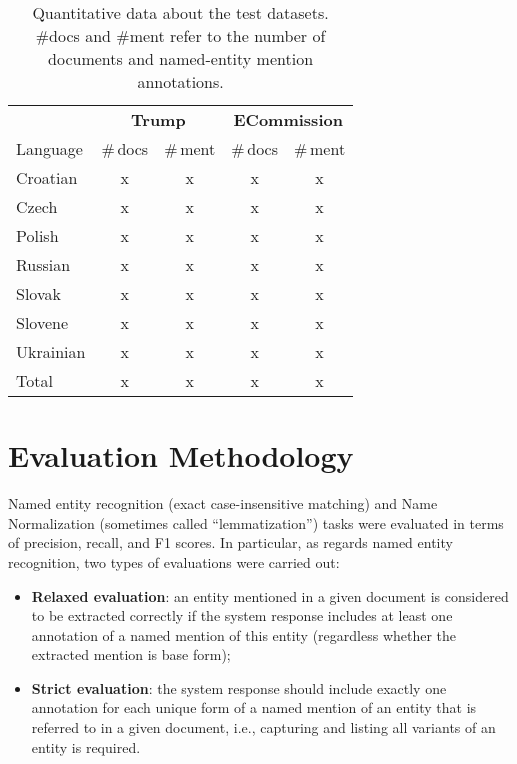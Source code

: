 \documentclass[11pt]{article}
\begin{document}
\begin{table}
\begin{center}
\begin{footnotesize}
\begin{tabular}{lcccc}
\toprule 
 & \multicolumn{2}{c}{\textbf{{\sc Trump}}} & \multicolumn{2}{c}{\textbf{{\sc ECommission}}} \\
\cmidrule(lr){2-3}
\cmidrule(lr){4-5}
Language &  \#\,docs & \#\,ment & \#\,docs & \#\,ment \\
\midrule
Croatian & x & x & x & x \\
Czech & x & x & x & x \\
Polish & x & x & x & x \\
Russian & x & x & x & x \\
Slovak  & x & x & x & x \\
Slovene & x & x & x & x \\
Ukrainian & x & x & x & x \\
\midrule
Total & x & x & x & x  \\
\bottomrule
\end{tabular}
\end{footnotesize}
\end{center}
\caption{Quantitative data about the test datasets. \#docs and \#ment refer to the number of documents and named-entity mention annotations.}
\label{tab:datasets}
\end{table}


\section{Evaluation Methodology}
\label{sec:evaluation}

Named entity recognition (exact case-insensitive matching) and  Name Normalization (sometimes called “lemmatization”) tasks were evaluated in terms of precision, recall, and F1 scores. In particular, as regards named entity recognition, two types of evaluations were carried out:

\begin{itemize}

\item \textbf{Relaxed evaluation}: an entity mentioned in a given document is considered to be extracted correctly if the system response includes at least one annotation of a named mention of this entity (regardless whether the extracted mention is base form);

\item \textbf{Strict evaluation}: the system response should include exactly one annotation for each unique form of a named mention of an entity that is referred to in a given document, i.e., capturing and listing all variants of an entity is required.

\end{itemize}
\end{document}
